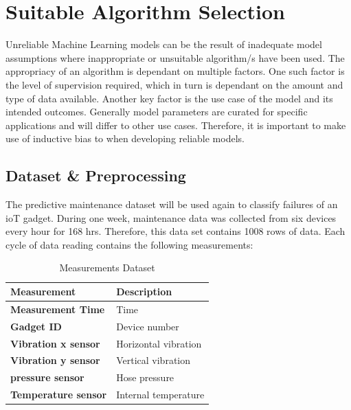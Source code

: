 \documentclass[a4paper,12pt]{report}
\begin{document}
\chapter{Suitable Algorithm Selection}
Unreliable Machine Learning models can be the result of inadequate model assumptions where inappropriate or unsuitable algorithm/s have been used.
The appropriacy of an algorithm is dependant on multiple factors. One such factor is the level of supervision required, which in turn is dependant on the amount and type of data available.
Another key factor is the use case of the model and its intended outcomes. Generally model parameters are curated for specific applications and will differ to other use cases.
Therefore, it is important to make use of inductive bias\cite{saria2019tutorial} to when developing reliable models.

\section{Dataset \& Preprocessing}
The predictive maintenance dataset will be used again to classify failures of an ioT gadget.
During one week, maintenance data was collected from six devices every hour for 168 hrs.
Therefore, this data set contains 1008 rows of data. 
Each cycle of data reading contains the following measurements: 

\begin{table}[ht]
    \begin{center}
        \caption{Measurements Dataset} 
        \begin{tabular}{ l|l } 
         \toprule
         \textbf{Measurement} & \textbf{Description} \\  [0.5ex] 
         \midrule
         \textbf{Measurement Time} & Time \\
         \textbf{Gadget ID} & Device number \\
         \textbf{Vibration x sensor} & Horizontal vibration \\ 
         \textbf{Vibration y sensor} & Vertical vibration \\ 
         \textbf{pressure sensor} & Hose pressure \\
         \textbf{Temperature sensor} & Internal temperature \\
         \bottomrule
        \end{tabular}
    \end{center}
\end{table}
\end{document}
